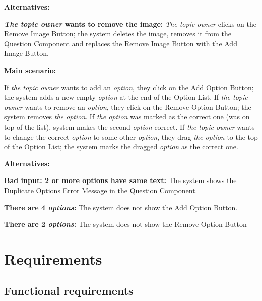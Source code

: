 \documentclass[
    english, %
]{VUMIFPSkursinis}
\begin{document}
\noindent\textbf{\fontsize{13}{15}\selectfont Alternatives:}

\textbf{\textit{The topic owner} wants to remove the image:} \textit{The topic owner} clicks on the Remove Image Button; the system deletes the image, removes it from the Question Component and replaces the Remove Image Button with the Add Image Button.

 \label{question-editor}

\noindent\textbf{\fontsize{13}{15}\selectfont Main scenario:}

If \textit{the topic owner} wants to add an \textit{option}, they click on the Add Option Button; the system adds a new empty \textit{option} at the end of the Option List. If \textit{the topic owner} wants to remove an \textit{option}, they click on the Remove Option Button; the system removes \textit{the option}. If \textit{the option} was marked as the correct one (was on top of the list), system makes the second \textit{option} correct. If \textit{the topic owner} wants to change the correct \textit{option} to some other \textit{option}, they drag \textit{the option} to the top of the Option List; the system marks the dragged \textit{option} as the correct one.

\noindent\textbf{\fontsize{13}{15}\selectfont Alternatives:}

\textbf{Bad input: 2 or more options have same text:} The system shows the Duplicate Options Error Message in the Question Component.

\textbf{There are 4 \textit{options}:} The system does not show the Add Option Button.

\textbf{There are 2 \textit{options}:} The system does not show the Remove Option Button

\section{Requirements}

\subsection{Functional requirements}

\end{document}
